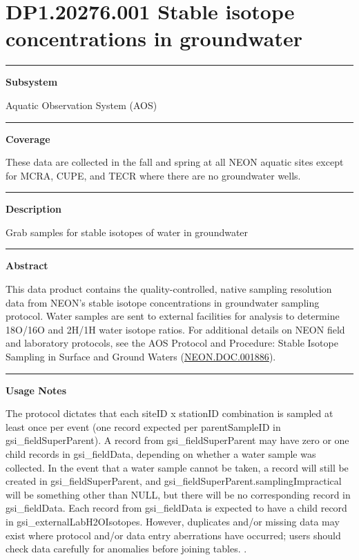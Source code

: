 \documentclass[]{article}
\begin{document}
\section{DP1.20276.001 Stable isotope concentrations in
groundwater}\label{dp1.20276.001-stable-isotope-concentrations-in-groundwater}

\begin{center}\rule{0.5\linewidth}{\linethickness}\end{center}

\textbf{Subsystem}

Aquatic Observation System (AOS)

\begin{center}\rule{0.5\linewidth}{\linethickness}\end{center}

\textbf{Coverage}

These data are collected in the fall and spring at all NEON aquatic
sites except for MCRA, CUPE, and TECR where there are no groundwater
wells.

\begin{center}\rule{0.5\linewidth}{\linethickness}\end{center}

\textbf{Description}

Grab samples for stable isotopes of water in groundwater

\begin{center}\rule{0.5\linewidth}{\linethickness}\end{center}

\textbf{Abstract}

This data product contains the quality-controlled, native sampling
resolution data from NEON's stable isotope concentrations in groundwater
sampling protocol. Water samples are sent to external facilities for
analysis to determine 18O/16O and 2H/1H water isotope ratios. For
additional details on NEON field and laboratory protocols, see the AOS
Protocol and Procedure: Stable Isotope Sampling in Surface and Ground
Waters
(\href{http://data.neonscience.org/api/v0/documents/NEON.DOC.001886vE}{NEON.DOC.001886}).

\begin{center}\rule{0.5\linewidth}{\linethickness}\end{center}

\textbf{Usage Notes}

The protocol dictates that each siteID x stationID combination is
sampled at least once per event (one record expected per parentSampleID
in gsi\_fieldSuperParent). A record from gsi\_fieldSuperParent may have
zero or one child records in gsi\_fieldData, depending on whether a
water sample was collected. In the event that a water sample cannot be
taken, a record will still be created in gsi\_fieldSuperParent, and
gsi\_fieldSuperParent.samplingImpractical will be something other than
NULL, but there will be no corresponding record in gsi\_fieldData. Each
record from gsi\_fieldData is expected to have a child record in
gsi\_externalLabH2OIsotopes. However, duplicates and/or missing data may
exist where protocol and/or data entry aberrations have occurred; users
should check data carefully for anomalies before joining tables.
\newpage
.
\end{document}
